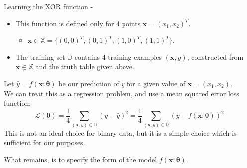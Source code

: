 \begin{frame}[t,allowframebreaks]{Learning the XOR function -}
    \begin{itemize}
        \item 
        This function is defined only for 
        4 points $\mathbf{x}=(x_1,x_2)^T$.
        \begin{itemize}
         \item 
         $\mathbf{x} \in \mathbb{X} 
          = \{(0,0)^T, (0,1)^T, (1,0)^T, (1,1)^T\}$.
        \end{itemize}
        \item 
        The training set $\mathbb{D}$ contains 
        4 training examples $(\mathbf{x},y)$,
        constructed from $\mathbf{x} \in \mathbb{X}$ 
        and the truth table given above.
    \end{itemize}

\framebreak

    Let $\hat{y}=f(\mathbf{x};\mathbf{\theta})$ be our prediction of $y$ for a 
    given value of $\mathbf{x}=(x_1,x_2)$.\\
    \vspace{0.3cm}
    We can treat this as a regression problem, and use a 
     
    \gls{mean squared error loss function}:
    \begin{equation}
        \mathcal{L}(\mathbf{\theta}) =  
        \frac{1}{4} 
        \sum_{(\mathbf{x},y) \in \mathbb{D}} 
        (y - \hat{y})^2 =
        \frac{1}{4} 
        \sum_{(\mathbf{x},y) \in \mathbb{D}} 
        (y - f(\mathbf{x};\mathbf{\theta}))^2
        \label{eq:learn_xor_loss_function_1}
    \end{equation}
    This is not an ideal choice for binary data,
    but it is a simple choice which is sufficient for our purposes.\\
    \vspace{0.2cm}

    What remains, is to specify the form of the model 
    $f(\mathbf{x};\mathbf{\theta})$.

\end{frame}

